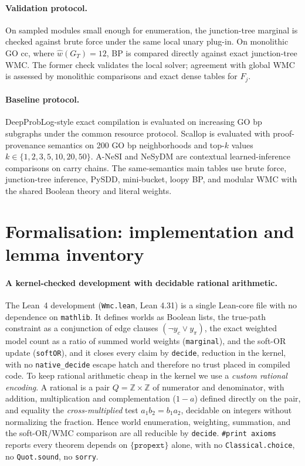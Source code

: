 \documentclass[letterpaper]{article}
\begin{document}
\paragraph{Validation protocol.}
On sampled modules small enough for enumeration, the junction-tree marginal is checked against brute force under the same local unary plug-in. On monolithic GO cc, where \(\widehat w(G_T)=12\), BP is compared directly against exact junction-tree WMC. The former check validates the local solver; agreement with global WMC is assessed by monolithic comparisons and exact dense tables for \(F_j\).

\paragraph{Baseline protocol.}
DeepProbLog-style exact compilation is evaluated on increasing GO bp
subgraphs under the common resource protocol. Scallop is evaluated with
proof-provenance semantics on 200 GO bp neighborhoods and top-\(k\) values
\(k\in\{1,2,3,5,10,20,50\}\). A-NeSI and NeSyDM are contextual
learned-inference comparisons on carry chains. The same-semantics main
tables use brute force, junction-tree inference, PySDD, mini-bucket, loopy
BP, and modular WMC with the shared Boolean theory and literal weights.

\section{Formalisation: implementation and lemma inventory}\label{app:lean}

\paragraph{A kernel-checked development with decidable rational arithmetic.}
The Lean~4 development (\texttt{Wmc.lean}, Lean 4.31) is a single Lean-core file with no
dependence on \texttt{mathlib}. It defines worlds as Boolean lists, the true-path constraint
as a conjunction of edge clauses $(\neg y_c \vee y_\pi)$, the exact weighted model count as a
ratio of summed world weights (\texttt{marginal}), and the soft-OR update (\texttt{softOR}),
and it closes every claim by \texttt{decide}, reduction in the kernel, with no
\texttt{native\_decide} escape hatch and therefore no trust placed in compiled code. To keep
rational arithmetic cheap in the kernel we use a \emph{custom rational encoding}. A rational
is a pair $Q=\mathbb{Z}\times\mathbb{Z}$ of numerator and denominator, with addition,
multiplication and complementation ($1-a$) defined directly on the pair, and equality the
\emph{cross-multiplied} test $a_1 b_2 = b_1 a_2$, decidable on integers without normalizing the
fraction. Hence world enumeration, weighting, summation, and the soft-OR/WMC comparison are all
reducible by \texttt{decide}. \texttt{\#print axioms} reports every theorem depends on
$\{\texttt{propext}\}$ alone, with no \texttt{Classical.choice}, no \texttt{Quot.sound}, no
\texttt{sorry}.
\end{document}

